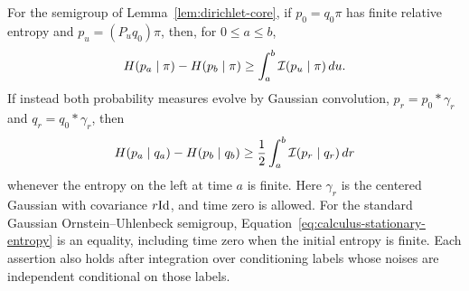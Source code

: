 \begin{lemma}\label{lem:entropy-calculus}
For the semigroup of Lemma~\ref{lem:dirichlet-core}, if
$p_0=q_0\pi$ has finite relative entropy and
$p_u=(P_uq_0)\pi$, then, for $0\le a\le b$,
\begin{equation}\label{eq:calculus-stationary-entropy}
 H(p_a\mid\pi)-H(p_b\mid\pi)
 \ge\int_a^b\mathcal I(p_u\mid\pi)\,du.
\end{equation}
If instead both probability measures evolve by Gaussian convolution,
$p_r=p_0*\gamma_r$ and $q_r=q_0*\gamma_r$, then
\begin{equation}\label{eq:calculus-heat-entropy}
 H(p_a\mid q_a)-H(p_b\mid q_b)
 \ge\frac12\int_a^b\mathcal I(p_r\mid q_r)\,dr
\end{equation}
whenever the entropy on the left at time $a$ is finite. Here
$\gamma_r$ is the centered Gaussian with covariance $r\mathrm{Id}$,
and time zero is allowed. For the standard Gaussian
Ornstein--Uhlenbeck semigroup, Equation~\eqref{eq:calculus-stationary-entropy}
is an equality, including time zero when the initial entropy is
finite. Each assertion also holds after integration over conditioning
labels whose noises are independent conditional on those labels.
\end{lemma}

